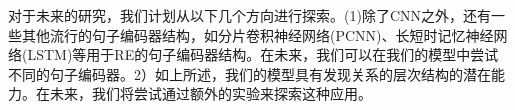 \begin{translation}
对于未来的研究，我们计划从以下几个方向进行探索。(1)除了CNN之外，还有一些其他流行的句子编码器结构，如分片卷积神经网络(PCNN)、长短时记忆神经网络(LSTM)等用于RE的句子编码器结构。在未来，我们可以在我们的模型中尝试不同的句子编码器。2）如上所述，我们的模型具有发现关系的层次结构的潜在能力。在未来，我们将尝试通过额外的实验来探索这种应用。

\nocite{wu2019open}


\end{translation}


